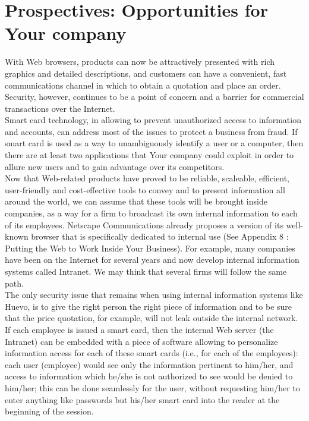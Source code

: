 \section{Prospectives: Opportunities for Your company}
With Web browsers, products can now be attractively presented with rich
graphics and detailed descriptions, and customers can have a
convenient, fast communications channel in which to obtain a quotation
and place an order. Security, however, continues to be a point of
concern and a barrier for commercial transactions over the Internet.\\

Smart card technology, in allowing to prevent unauthorized access to
information and accounts, can address most of the issues to protect a
business from fraud. If smart card is used as a way to unambiguously
identify a user or a computer, then there are at least two applications
that Your company could exploit in order to allure new users and to gain
advantage over its competitors.\\

Now that Web-related products have proved to be reliable, scaleable,
efficient, user-friendly and cost-effective tools to convey and to present
information all around the world, we can assume that these tools will be
brought inside companies, as a way for a firm to broadcast its own internal
information to each of its employees.  Netscape Communications already
proposes a version of its well-known browser that is specifically dedicated
to internal use (See Appendix 8 : Putting the Web to
Work Inside Your Business). For example, many companies have been on the
Internet for several years and now develop internal information systems
called Intranet. We may think that several firms will follow the same path.\\

The only security issue that remains when using internal information
systems like Huevo, is to give the right person the right piece of
information and to be sure that the price quotation, for example, will not
leak outside the internal network. If each employee is issued a smart card,
then the internal Web server (the Intranet) can be embedded with a piece of
software allowing to personalize information access for each of these smart
cards (i.e., for each of the employees): each user (employee) would see
only the information pertinent to him/her, and access to information which
he/she is not authorized to see would be denied to him/her; this can be
done seamlessly for the user, without requesting him/her to enter anything
like passwords but his/her smart card into the reader at the beginning
of the session.\\


